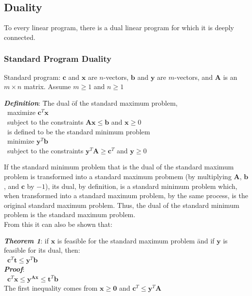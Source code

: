 \documentclass[10pt,letterpaper]{scrartcl}
\newcommand{\boph}[1]{\emph{\textbf{#1}}} %
\begin{document}
\begin{tabbing}
\subsection{Duality}
To every linear program, there is a dual linear program for which it is deeply connected. \\
\subsubsection*{Standard Program Duality}
Standard program: $\mathbf{c}$ and $\mathbf{x}$ are $n$-vectors, $\mathbf{b}$ and $\mathbf{y}$ are $m$-vectors, and $\mathbf{A}$ is an $m\times n$ matrix. Assume $m\geq 1$ and $n\geq 1$ \\
\begin{tabbing}
\boph{Definition}: \= The dual \= of the standard maximum problem, \\
\>\>\ maximize $\mathbf{c}^T\mathbf{x}$ \\
\>\>\ subject to the constraints $\mathbf{Ax}\leq\mathbf{b}$ and $\mathbf{x}\geq 0$ \\
\>\ is defined to be the standard minimum problem \\
\>\>\ minimize $\mathbf{y}^T\mathbf{b}$ \\
\>\>\ subject to the constraints $\mathbf{y}^T\mathbf{A}\geq\mathbf{c}^T$ and $\mathbf{y}\geq 0$\end{tabbing}
If the standard minimum problem that is the dual of the standard maximum problem is transformed into a standard maximum probmem (by multiplying $\mathbf{A}$, $\mathbf{b}$, and $\mathbf{c}$ by $-1$), its dual, by definition, is a standard minimum problem which, when transformed into a standard maximum problem, by the same process, is the original standard maximum problem. Thus, the dual of the standard minimum problem is the standard maximum problem. \\
From this it can also be shown that: \\
\begin{tabbing}
\boph{Theorem 1}: if $\mathbf{x}$ is feasible for the standard maximum problem \= and if $\mathbf{y}$ is feasible for its dual, then: \\
\>\ $\mathbf{c}^T\mathbf{t}\leq\mathbf{y}^T\mathbf{b}$ \\
\boph{Proof}: \\
\>\ $\mathbf{c}^T\mathbf{x}\leq\mathbf{y}^\mathbf{Ax}\leq\mathbf{t}^T\mathbf{b}$ \\
The first inequality comes from $\mathbf{x}\geq \mathbf{0}$ and $\mathbf{c}^T\leq\mathbf{y}^T\mathbf{A}$ \\

\end{tabbing}
\end{tabbing}
\end{document}
